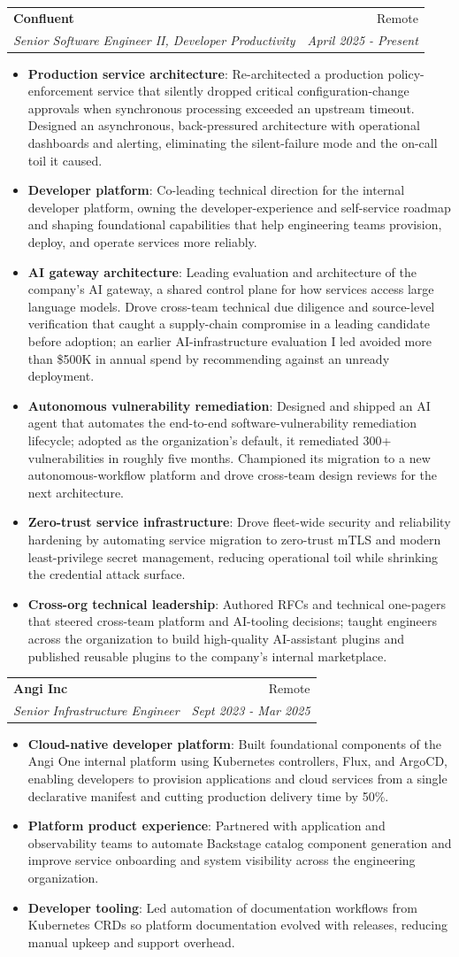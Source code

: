 \documentclass[letterpaper,11pt]{article}
\makeatletter
\newcommand{\resumeItem}[2]{
\item\small{
\textbf{#1}{: #2 \vspace{-2pt}}
}
}
\newcommand{\resumeSubheading}[4]{
\vspace{-1pt}\item
\begin{tabular*}{0.97\textwidth}[t]{l@{\extracolsep{\fill}}r}
    \textbf{#1}       & #2                 \\
    \textit{\small#3} & \textit{\small #4} \\
\end{tabular*}\vspace{-3pt}
}
\newcommand{\resumeItemListStart}{\begin{itemize}}
\newcommand{\resumeItemListEnd}{\end{itemize}\vspace{-5pt}}
\makeatother
\begin{document}
\resumeSubheading
{Confluent}{Remote}
{Senior Software Engineer II, Developer Productivity}{April 2025 - Present}
\resumeItemListStart
\resumeItem{Production service architecture}
{Re-architected a production policy-enforcement service that silently dropped critical configuration-change approvals when synchronous processing exceeded an upstream timeout. Designed an asynchronous, back-pressured architecture with operational dashboards and alerting, eliminating the silent-failure mode and the on-call toil it caused.}
\resumeItem{Developer platform}
{Co-leading technical direction for the internal developer platform, owning the developer-experience and self-service roadmap and shaping foundational capabilities that help engineering teams provision, deploy, and operate services more reliably.}
\resumeItem{AI gateway architecture}
{Leading evaluation and architecture of the company's AI gateway, a shared control plane for how services access large language models. Drove cross-team technical due diligence and source-level verification that caught a supply-chain compromise in a leading candidate before adoption; an earlier AI-infrastructure evaluation I led avoided more than \$500K in annual spend by recommending against an unready deployment.}
\resumeItem{Autonomous vulnerability remediation}
{Designed and shipped an AI agent that automates the end-to-end software-vulnerability remediation lifecycle; adopted as the organization's default, it remediated 300+ vulnerabilities in roughly five months. Championed its migration to a new autonomous-workflow platform and drove cross-team design reviews for the next architecture.}
\resumeItem{Zero-trust service infrastructure}
{Drove fleet-wide security and reliability hardening by automating service migration to zero-trust mTLS and modern least-privilege secret management, reducing operational toil while shrinking the credential attack surface.}
\resumeItem{Cross-org technical leadership}
{Authored RFCs and technical one-pagers that steered cross-team platform and AI-tooling decisions; taught engineers across the organization to build high-quality AI-assistant plugins and published reusable plugins to the company's internal marketplace.}
\resumeItemListEnd

\resumeSubheading
{Angi Inc}{Remote}
{Senior Infrastructure Engineer}{Sept 2023 - Mar 2025}
\resumeItemListStart
\resumeItem{Cloud-native developer platform}
{Built foundational components of the Angi One internal platform using Kubernetes controllers, Flux, and ArgoCD, enabling developers to provision applications and cloud services from a single declarative manifest and cutting production delivery time by 50\%.}
\resumeItem{Platform product experience}
{Partnered with application and observability teams to automate Backstage catalog component generation and improve service onboarding and system visibility across the engineering organization.}
\resumeItem{Developer tooling}
{Led automation of documentation workflows from Kubernetes CRDs so platform documentation evolved with releases, reducing manual upkeep and support overhead.}
\resumeItemListEnd
\end{document}
